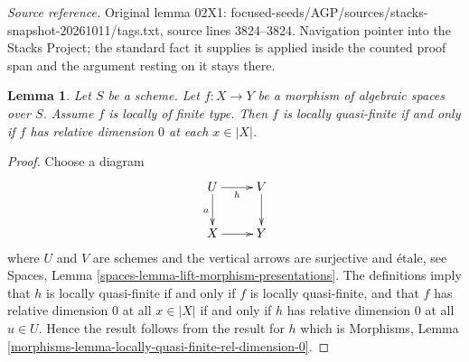 \documentclass[10pt,a4paper]{amsart}
\theoremstyle{plain}
\newtheorem{lemma}[subsection]{Lemma}
\theoremstyle{definition}
\theoremstyle{remark}
\numberwithin{equation}{subsection}
\begin{document}
\noindent\textit{Source reference.} Original lemma 02X1: focused-seeds/AGP/sources/stacks-snapshot-20261011/tags.txt, source lines 3824--3824. Navigation pointer into the Stacks Project; the standard fact it supplies is applied inside the counted proof span and the argument resting on it stays there.\par\medskip
\begin{lemma}
\label{lemma-locally-quasi-finite-rel-dimension-0}
Let $S$ be a scheme.
Let $f : X \to Y$ be a morphism of algebraic spaces over $S$.
Assume $f$ is locally of finite type.
Then $f$ is locally quasi-finite if and only if $f$ has relative
dimension $0$ at each $x \in |X|$.
\end{lemma}

\begin{proof}
Choose a diagram
$$
\xymatrix{
U \ar[r]_h \ar[d]_a & V \ar[d] \\
X \ar[r] & Y
}
$$
where $U$ and $V$ are schemes and the vertical arrows are surjective and
\'etale, see
Spaces, Lemma \ref{spaces-lemma-lift-morphism-presentations}.
The definitions imply that
$h$ is locally quasi-finite if and only if $f$ is locally quasi-finite,
and that $f$ has relative dimension $0$ at all $x \in |X|$ if and
only if $h$ has relative dimension $0$ at all $u \in U$.
Hence the result follows from the result for $h$ which is
Morphisms, Lemma \ref{morphisms-lemma-locally-quasi-finite-rel-dimension-0}.
\end{proof}
\end{document}
